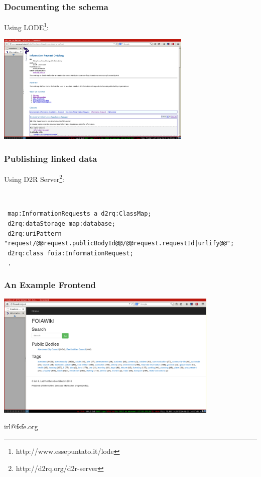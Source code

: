 \documentclass{beamer}
\begin{document}
\begin{frame}
	\frametitle{Documenting the schema}
	Using LODE\footnote{http://www.essepuntato.it/lode}:
	\begin{center}
		\includegraphics[width=0.7\textwidth]{ontology.png}
	\end{center}
\end{frame}

\begin{frame}
	\frametitle{Publishing linked data}
	Using D2R Server\footnote{http://d2rq.org/d2r-server}:

\ 
	
	{\tt \tiny
map:InformationRequests a d2rq:ClassMap; \\
\        d2rq:dataStorage map:database; \\
\        d2rq:uriPattern "request/@@request.publicBodyId@@/@@request.requestId|urlify@@"; \\
\        d2rq:class foia:InformationRequest; \\
\ .}
\end{frame}

\begin{frame}
	\frametitle{An Example Frontend}
	\begin{center}
		\includegraphics[width=0.8\textwidth]{interface.png}
	\end{center}
\end{frame}

\begin{frame}
	\begin{center}
		irl@fsfe.org
	\end{center}
\end{frame}
\end{document}
